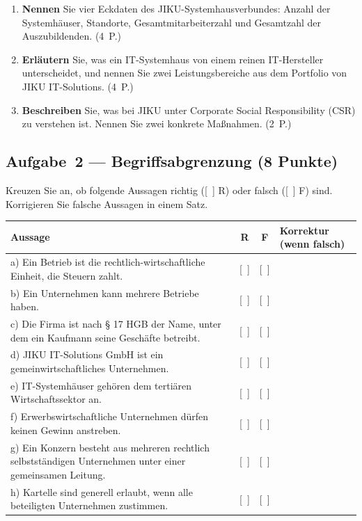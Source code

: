 \documentclass[11pt, a4paper]{article}
\begin{document}
\begin{enumerate}[label=(\alph*)]
  \item \textbf{Nennen} Sie vier Eckdaten des JIKU-Systemhausverbundes: Anzahl der Systemhäuser,
  Standorte, Gesamtmitarbeiterzahl und Gesamtzahl der Auszubildenden. \hfill (4~P.)

  \vspace{3.5cm}

  \item \textbf{Erläutern} Sie, was ein IT-Systemhaus von einem reinen IT-Hersteller unterscheidet,
  und nennen Sie zwei Leistungsbereiche aus dem Portfolio von JIKU IT-Solutions. \hfill (4~P.)

  \vspace{4cm}

  \item \textbf{Beschreiben} Sie, was bei JIKU unter Corporate Social Responsibility (CSR) zu
  verstehen ist. Nennen Sie zwei konkrete Maßnahmen. \hfill (2~P.)

  \vspace{3cm}
\end{enumerate}

\subsection*{Aufgabe~2 --- Begriffsabgrenzung (8 Punkte)}

Kreuzen Sie an, ob folgende Aussagen richtig ({[~]} R) oder falsch ({[~]} F) sind.
Korrigieren Sie falsche Aussagen in einem Satz.

\bigskip

\noindent
\begin{tabular}{|p{8.5cm}|c|c|p{4cm}|}
\hline
\textbf{Aussage} & \textbf{R} & \textbf{F} & \textbf{Korrektur (wenn falsch)}\\
\hline
a) Ein Betrieb ist die rechtlich-wirtschaftliche Einheit, die Steuern zahlt. & {[~]} & {[~]} & \\[0.8cm]
\hline
b) Ein Unternehmen kann mehrere Betriebe haben. & {[~]} & {[~]} & \\[0.8cm]
\hline
c) Die Firma ist nach § 17 HGB der Name, unter dem ein Kaufmann seine Geschäfte betreibt. & {[~]} & {[~]} & \\[0.8cm]
\hline
d) JIKU IT-Solutions GmbH ist ein gemeinwirtschaftliches Unternehmen. & {[~]} & {[~]} & \\[0.8cm]
\hline
e) IT-Systemhäuser gehören dem tertiären Wirtschaftssektor an. & {[~]} & {[~]} & \\[0.8cm]
\hline
f) Erwerbswirtschaftliche Unternehmen dürfen keinen Gewinn anstreben. & {[~]} & {[~]} & \\[0.8cm]
\hline
g) Ein Konzern besteht aus mehreren rechtlich selbstständigen Unternehmen unter einer gemeinsamen Leitung. & {[~]} & {[~]} & \\[0.8cm]
\hline
h) Kartelle sind generell erlaubt, wenn alle beteiligten Unternehmen zustimmen. & {[~]} & {[~]} & \\[0.8cm]
\hline
\end{tabular}
\end{document}
